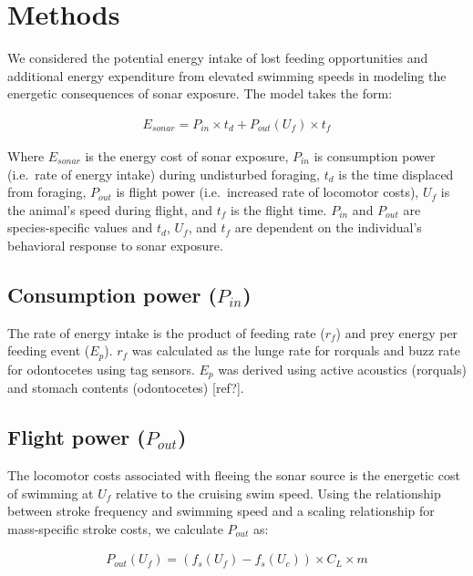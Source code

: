 \documentclass[]{elsarticle} %
\begin{document}
\section{Methods}\label{methods}

We considered the potential energy intake of lost feeding opportunities
and additional energy expenditure from elevated swimming speeds in
modeling the energetic consequences of sonar exposure. The model takes
the form:

\begin{align}
E_{sonar} = P_{in} \times t_d + P_{out}(U_f) \times t_f
\end{align}

Where \(E_{sonar}\) is the energy cost of sonar exposure, \(P_{in}\) is
consumption power (i.e.~rate of energy intake) during undisturbed
foraging, \(t_d\) is the time displaced from foraging, \(P_{out}\) is
flight power (i.e.~increased rate of locomotor costs), \(U_f\) is the
animal's speed during flight, and \(t_f\) is the flight time. \(P_{in}\)
and \(P_{out}\) are species-specific values and \(t_d\), \(U_f\), and
\(t_f\) are dependent on the individual's behavioral response to sonar
exposure.

\subsection{\texorpdfstring{Consumption power
(\(P_{in}\))}{Consumption power (P\_\{in\})}}\label{consumption-power-p_in}

The rate of energy intake is the product of feeding rate (\(r_f\)) and
prey energy per feeding event (\(E_p\)). \(r_f\) was calculated as the
lunge rate for rorquals and buzz rate for odontocetes using tag sensors.
\(E_p\) was derived using active acoustics (rorquals) and stomach
contents (odontocetes) {[}ref?{]}.

\subsection{\texorpdfstring{Flight power
(\(P_{out}\))}{Flight power (P\_\{out\})}}\label{flight-power-p_out}

The locomotor costs associated with fleeing the sonar source is the
energetic cost of swimming at \(U_f\) relative to the cruising swim
speed. Using the relationship between stroke frequency and swimming
speed and a scaling relationship for mass-specific stroke costs, we
calculate \(P_{out}\) as:

\begin{align}
P_{out}(U_f) = (f_s(U_f) - f_s(U_c)) \times C_L \times m
\end{align}
\end{document}
